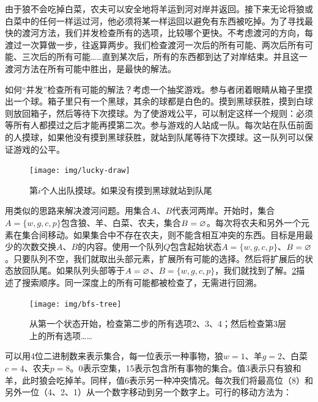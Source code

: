 \documentclass[b5paper]{ctexart}
\begin{document}

由于狼不会吃掉白菜，农夫可以安全地将羊运到河对岸并返回。接下来无论将狼或白菜中的任何一样运过河，他必须将某一样运回以避免有东西被吃掉。为了寻找最快的渡河方法，我们并发检查所有的选项，比较哪个更快。不考虑渡河的方向，每渡过一次算做一步，往返算两步。我们检查渡河一次后的所有可能、两次后所有可能、三次后的所有可能……直到某次后，所有的东西都到达了对岸结束。并且这一渡河方法在所有可能中胜出，是最快的解法。

如何“并发”检查所有可能的解法？考虑一个抽奖游戏。参与者闭着眼睛从箱子里摸出一个球。箱子里只有一个黑球，其余的球都是白色的。摸到黑球获胜，摸到白球则放回箱子，然后等待下次摸球。为了使游戏公平，可以制定这样一个规则：必须等所有人都摸过之后才能再摸第二次。参与游戏的人站成一队。每次站在队伍前面的人摸球，如果他没有摸到黑球获胜，就站到队尾等待下次摸球。这一队列可以保证游戏的公平。

\begin{figure}[htbp]
 \centering
 \texttt{[image: img/lucky-draw]}
 \caption{第$i$个人出队摸球。如果没有摸到黑球就站到队尾}
 \label{fig:luck-draw}
\end{figure}

用类似的思路来解决渡河问题。用集合$A$、$B$代表河两岸。开始时，集合$A = \{w, g, c, p\}$包含狼、羊、白菜、农夫，集合$B = \varnothing$。每次将农夫和另外一个元素在集合间移动。如果集合中不存在农夫，则不能含相互冲突的东西。目标是用最少的次数交换$A$、$B$的内容。使用一个队列$Q$包含起始状态$A = \{w, g, c, p\}$、$B=\varnothing$。只要队列不空，我们就取出头部元素，扩展所有可能的选择。然后将扩展后的状态放回队尾。如果队列头部等于$A=\varnothing$、$B=\{w, g, c, p\}$，我们就找到了解。\cref{fig:bfs-tree}描述了搜索顺序。同一深度上的所有可能都被检查了，无需进行回溯。

\begin{figure}[htbp]
 \centering
 \texttt{[image: img/bfs-tree]}
 \caption{从第一个状态开始，检查第二步的所有选项2、3、4；然后检查第3层上的所有选项……}
 \label{fig:bfs-tree}
\end{figure}

可以用4位二进制数来表示集合，每一位表示一种事物，狼$w=1$、羊$g=2$、白菜$c=4$、农夫$p=8$。0表示空集，15表示包含所有事物的集合。值3表示只有狼和羊，此时狼会吃掉羊。同样，值6表示另一种冲突情况。每次我们将最高位（8）和另外一位（4、2、1）从一个数字移动到另一个数字上。可行的移动方法为：
\end{document}
